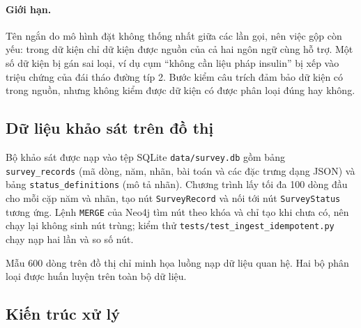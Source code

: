 \documentclass[11pt,a4paper]{article}
\begin{document}
\paragraph{Giới hạn.}
Tên ngắn do mô hình đặt không thống nhất giữa các lần gọi, nên việc gộp còn yếu: trong \nFacts{} dữ kiện chỉ
\nBilingualFacts{} dữ kiện được nguồn của cả hai ngôn ngữ cùng hỗ trợ. Một số dữ kiện bị gán sai loại, ví dụ cụm
“không cần liệu pháp insulin” bị xếp vào triệu chứng của đái tháo đường típ 2. Bước kiểm câu trích đảm bảo dữ kiện
có trong nguồn, nhưng không kiểm được dữ kiện có được phân loại đúng hay không.

\subsection{Dữ liệu khảo sát trên đồ thị}

Bộ khảo sát được nạp vào tệp SQLite \texttt{data/survey.db} gồm bảng \texttt{survey\_records} (mã dòng, năm, nhãn,
bài toán và các đặc trưng dạng JSON) và bảng \texttt{status\_definitions} (mô tả nhãn). Chương trình lấy tối đa 100
dòng đầu cho mỗi cặp năm và nhãn, tạo nút \texttt{SurveyRecord} và nối tới nút \texttt{SurveyStatus} tương ứng.
Lệnh \texttt{MERGE} của Neo4j tìm nút theo khóa và chỉ tạo khi chưa có, nên chạy lại không sinh nút trùng;
kiểm thử \texttt{tests/test\_ingest\_idempotent.py} chạy nạp hai lần và so số nút.

Mẫu 600 dòng trên đồ thị chỉ minh họa luồng nạp dữ liệu quan hệ. Hai bộ phân loại được huấn luyện trên toàn bộ dữ liệu.

\subsection{Kiến trúc xử lý}
\end{document}

